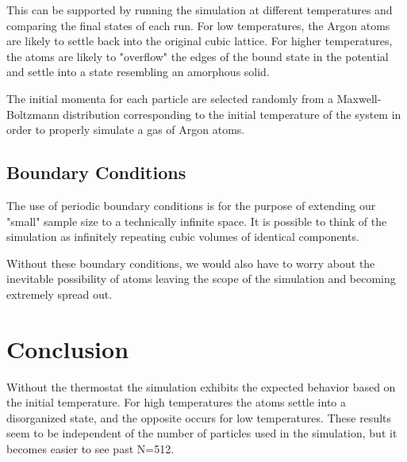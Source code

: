 \documentclass[10pt,letterpaper]{article}
\begin{document}
This can be supported by running the simulation at different temperatures and comparing the final states of each run. For low temperatures, the Argon atoms are likely to settle back into the original cubic lattice. For higher temperatures, the atoms are likely to "overflow" the edges of the bound state in the potential and settle into a state resembling an amorphous solid.

The initial momenta for each particle are selected randomly from a Maxwell-Boltzmann distribution corresponding to the initial temperature of the system in order to properly simulate a gas of Argon atoms.

\subsection{Boundary Conditions}

The use of periodic boundary conditions is for the purpose of extending our "small" sample size to a technically infinite space. It is possible to think of the simulation as infinitely repeating cubic volumes of identical components.

Without these boundary conditions, we would also have to worry about the inevitable possibility of atoms leaving the scope of the simulation and becoming extremely spread out.




\section{Conclusion}

Without the thermostat the simulation exhibits the expected behavior based on the initial temperature. For high temperatures the atoms settle into a disorganized state, and the opposite occurs for low temperatures. These results seem to be independent of the number of particles used in the simulation, but it becomes easier to see past N=512.
\end{document}
